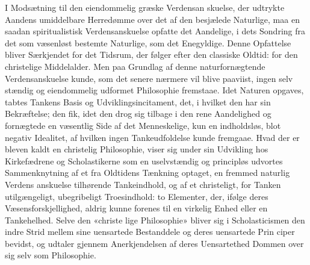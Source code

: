 \documentclass[12pt,a4paper]{book}
\begin{document}
I Modsætning til den eiendommelig græske Verdensan\-%
skuelse, der udtrykte Aandens umiddelbare Herredømme over
det af den besjælede Naturlige, maa en saadan spiritualistisk
Verdensanskuelse opfatte det Aandelige, i dets Sondring fra
det som væsenløst bestemte Naturlige, som det Enegyldige.
Denne Opfattelse bliver Særkjendet for det Tidsrum, der følger
efter den classiske Oldtid: for den christelige Middelalder.
Men paa Grundlag af denne naturfornægtende Verdensanskuelse
kunde, som det senere nærmere vil blive paaviist, ingen selv\-%
stændig og eiendommelig udformet Philosophie fremstaae. Idet
Naturen opgaves, tabtes Tankens Basis og Udviklingsincitament,
det, i hvilket den har sin Bekræftelse; den fik, idet den drog
sig tilbage i den rene Aandelighed og fornægtede en væsentlig
Side af det Menneskelige, kun en indholdsløs, blot negativ
Idealitet, af hvilken ingen Tankeudfoldelse kunde fremgaae.
Hvad der er bleven kaldt en christelig Philosophie, viser sig
under sin Udvikling hos Kirkefædrene og Scholastikerne som
en uselvstændig og principløs udvortes Sammenknytning af et
fra Oldtidens Tænkning optaget, en fremmed naturlig Verdens\-%
anskuelse tilhørende Tankeindhold, og af et christeligt, for
Tanken utilgængeligt, ubegribeligt Troesindhold: to Elementer,
der, ifølge deres Væsensforskjellighed, aldrig kunne forenes til
en virkelig Enhed eller en Tankehelhed. Selve den «christe\-%
lige Philosophie» bliver sig i Scholasticismen den indre Strid
mellem sine uensartede Bestanddele og deres uensartede Prin\-%
ciper bevidst, og udtaler gjennem Anerkjendelsen af deres
Uensartethed Dommen over sig selv som Philosophie.
\end{document}
